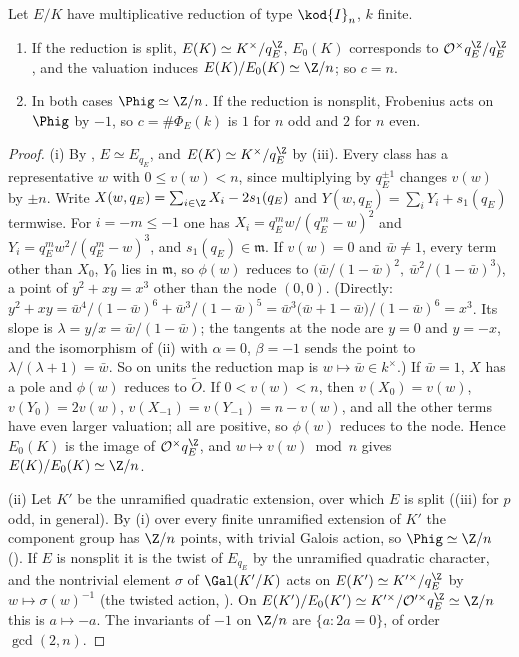 \begin{proposition}\label{prop:reduction:tate-tamagawa}
Let $E/K$ have multiplicative reduction of type $\kod{I}_n$, $k$ finite.
\begin{enumerate}[label=(\roman*)]
\item If the reduction is split, $E(K)\simeq K^\times/q_E^{\Z}$, $E_0(K)$ corresponds to $\mathcal O^\times q_E^{\Z}/q_E^{\Z}$, and the valuation
induces $E(K)/E_0(K)\simeq\Z/n$; so $c=n$.
\item In both cases $\Phig\simeq\Z/n$. If the reduction is nonsplit, Frobenius acts on $\Phig$ by $-1$, so $c=\#\Phi_E(k)$ is $1$ for $n$
odd and $2$ for $n$ even.
\end{enumerate}
\end{proposition}

\begin{proof}
(i) By , $E\simeq E_{q_E}$, and $E(K)\simeq K^\times/q_E^{\Z}$ by (iii). Every
class has a representative $w$ with $0\le v(w)<n$, since multiplying by $q_E^{\pm1}$ changes $v(w)$ by $\pm n$. Write $X(w,q_E)=\sum_{i\in\Z}X_i-2s_1(q_E)$ and $Y(w,q_E)=\sum_iY_i+s_1(q_E)$
termwise. For $i=-m\le-1$ one has $X_i=q_E^mw/(q_E^m-w)^2$ and $Y_i=q_E^mw^2/(q_E^m-w)^3$, and $s_1(q_E)\in\mathfrak m$. If $v(w)=0$ and
$\bar w\ne1$, every term other than $X_0$, $Y_0$ lies in $\mathfrak m$, so $\phi(w)$ reduces to
$\bigl(\bar w/(1-\bar w)^2,\ \bar w^2/(1-\bar w)^3\bigr)$, a point of $y^2+xy=x^3$ other than the node $(0,0)$. (Directly:
$y^2+xy=\bar w^4/(1-\bar w)^6+\bar w^3/(1-\bar w)^5=\bar w^3\bigl(\bar w+1-\bar w\bigr)/(1-\bar w)^6=x^3$. Its slope is
$\lambda=y/x=\bar w/(1-\bar w)$; the tangents at the node are $y=0$ and $y=-x$, and the isomorphism of (ii)
with $\alpha=0$, $\beta=-1$ sends the point to $\lambda/(\lambda+1)=\bar w$. So on units the reduction map is $w\mapsto\bar w\in k^\times$.) If $\bar w=1$, $X$ has a pole and
$\phi(w)$ reduces to $\tilde O$. If $0<v(w)<n$, then $v(X_0)=v(w)$, $v(Y_0)=2v(w)$, $v(X_{-1})=v(Y_{-1})=n-v(w)$, and all the other terms have even larger
valuation; all are positive, so $\phi(w)$ reduces to the node. Hence $E_0(K)$ is the image of $\mathcal O^\times q_E^{\Z}$, and
$w\mapsto v(w)\bmod n$ gives $E(K)/E_0(K)\simeq\Z/n$.

(ii) Let $K'$ be the unramified quadratic extension, over which $E$ is split ((iii) for $p$ odd,
 in general). By (i) over every finite unramified extension of $K'$ the component group has
$\Z/n$ points, with trivial Galois action, so $\Phig\simeq\Z/n$ (). If $E$ is nonsplit it is the
twist of $E_{q_E}$ by the unramified quadratic character, and the nontrivial element $\sigma$ of $\Gal(K'/K)$ acts on
$E(K')\simeq K'^\times/q_E^{\Z}$ by $w\mapsto\sigma(w)^{-1}$ (the twisted action, ). On
$E(K')/E_0(K')\simeq K'^\times/\mathcal O'^\times q_E^{\Z}\simeq\Z/n$ this is $a\mapsto-a$. The invariants of $-1$ on $\Z/n$ are $\{a:2a=0\}$, of order
$\gcd(2,n)$.
\end{proof}

